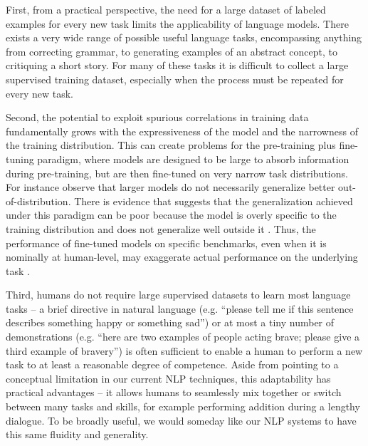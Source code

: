 \documentclass{article}
\begin{document}
First, from a practical perspective, the need for a large dataset of labeled examples for every new task limits the applicability of language models.  There exists a very wide range of possible useful language tasks, encompassing anything from correcting grammar, to generating examples of an abstract concept, to critiquing a short story.  For many of these tasks it is difficult to collect a large supervised training dataset, especially when the process must be repeated for every new task.

Second, the potential to exploit spurious correlations in training data fundamentally grows with the expressiveness of the model and the narrowness of the training distribution. This can create problems for the pre-training plus fine-tuning paradigm, where models are designed to be large to absorb information during pre-training, but are then fine-tuned on very narrow task distributions. For instance \cite{hendrycks2020pretrained} observe that larger models do not necessarily generalize better out-of-distribution. There is evidence that suggests that the generalization achieved under this paradigm can be poor because the model is overly specific to the training distribution and does not generalize well outside it \cite{yogatama2019learning, mccoy2019right}. Thus, the performance of fine-tuned models on specific benchmarks, even when it is nominally at human-level, may exaggerate actual performance on the underlying task \cite{gururangan2018annotation, niven2019probing}.

Third, humans do not require large supervised datasets to learn most language tasks -- a brief directive in natural language (e.g. ``please tell me if this sentence describes something happy or something sad'') or at most a tiny number of demonstrations (e.g. ``here are two examples of people acting brave; please give a third example of bravery'') is often sufficient to enable a human to perform a new task to at least a reasonable degree of competence.  Aside from pointing to a conceptual limitation in our current NLP techniques, this adaptability has practical advantages -- it allows humans to seamlessly mix together or switch between many tasks and skills, for example performing addition during a lengthy dialogue.  To be broadly useful, we would someday like our NLP systems to have this same fluidity and generality.
\end{document}
